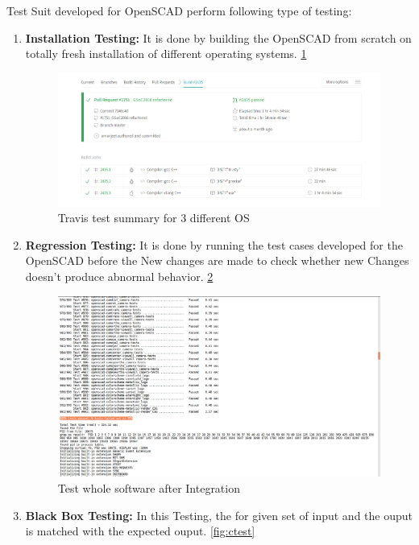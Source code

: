 Test Suit developed for OpenSCAD perform following type of testing:
 
 \begin{enumerate}
 	\item \textbf{Installation Testing:} It is done by building the OpenSCAD from scratch on totally fresh installation of different operating systems. \ref{fig:travis}
 	
 	\begin{figure}
 		\centering
 		\includegraphics[width=1\linewidth]{images/travis}
 		\caption{Travis test summary for 3 different OS }
 		\label{fig:travis}
 	\end{figure}
 	
 	\item \textbf{Regression Testing:} It is done by running the test cases developed for the OpenSCAD before the New changes are made to check whether new Changes doesn't produce abnormal behavior. \ref{fig:generalTest}
 	
 	\begin{figure}
 		\centering
 		\includegraphics[width=0.8\linewidth]{images/generalTest}
 		\caption{Test whole software after Integration}
 		\label{fig:generalTest}
 	\end{figure}
 	
 	\item \textbf{Black Box Testing:} In this Testing, the for given set of input and the ouput is matched with the expected ouput. \ref{fig:ctest}
 	

\end{enumerate}
